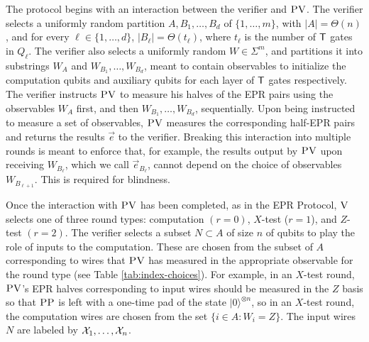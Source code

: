 \documentclass[11pt,letter]{article}
\theoremstyle{remark}
\theoremstyle{definition}
\newcommand{\ket}[1]{|#1\rangle}
\newcommand{\ver}{\textsc{V}}
\newcommand{\pv}{\textsc{PV}}
\newcommand{\pp}{\textsc{PP}}
\begin{document}
The protocol begins with an interaction between the verifier and $\pv$. The verifier selects a uniformly random partition $A,B_1,\dots,B_d$ of $\{1,\dots,m\}$, with $|A|=\Theta(n)$, and for every $\ell\in\{1,\dots,d\}$, $|B_{\ell}|=\Theta(t_\ell)$, where $t_{\ell}$ is the number of $\sf T$ gates in $Q_\ell$. The verifier also selects a uniformly random $W\in\Sigma^m$, and partitions it into substrings $W_A$ and $W_{B_1},\ldots,W_{B_d}$, meant to contain observables to initialize the computation qubits and auxiliary qubits for each layer of ${\sf T}$ gates respectively. The verifier instructs $\pv$ to measure his halves of the EPR pairs using the observables $W_A$ first, and then $W_{B_1},\ldots,W_{B_d}$, sequentially. Upon being instructed to measure a set of observables, $\pv$ measures the corresponding half-EPR pairs and returns the results $\vec{e}$ to the verifier. Breaking this interaction into multiple rounds is meant to enforce that, for example, the results output by $\pv$ upon receiving $W_{B_{\ell}}$, which we call $\vec{e}_{B_{\ell}}$, cannot depend on the choice of observables $W_{B_{\ell+1}}$. This is required for blindness. 

Once the interaction with $\pv$ has been completed, as in the EPR Protocol, $\ver$ selects one of three round types: computation $(r=0)$, $X$-test ($r=1$), and $Z$-test $(r=2)$. 
The verifier selects a subset $N\subset A$ of size $n$ of qubits to play the role of inputs to the computation. These are chosen from the subset of $A$ corresponding to wires that $\pv$ has measured in the appropriate observable for the round type (see Table \ref{tab:index-choices}). For example, in an $X$-test round, $\pv$'s EPR halves corresponding to input wires should be measured in the $Z$ basis so that $\pp$ is left with a one-time pad of the state $\ket{0}^{\otimes n}$, so in an $X$-test round, the computation wires are chosen from the set $\{i\in A:W_i=Z\}$. The input wires $N$ are labeled by ${\cal X}_1,\dots,{\cal X}_n$. 
\end{document}
